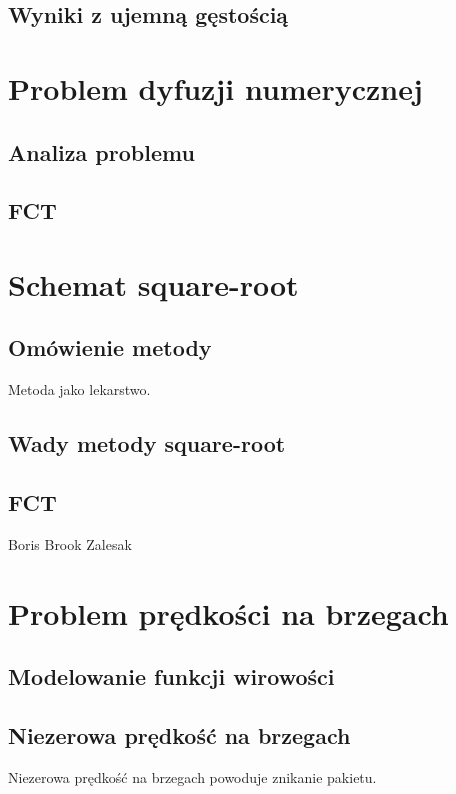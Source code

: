 \documentclass[a4paper,12pt]{book}
\begin{document}
\section{Wyniki z ujemną gęstością}
\chapter{Problem dyfuzji numerycznej}
\section{Analiza problemu}
\section{FCT}

\chapter{Schemat square-root}
\section{Omówienie metody}
Metoda jako lekarstwo.
\section{Wady metody square-root}
\section{FCT}
Boris Brook
Zalesak
\chapter{Problem prędkości na brzegach}
\section{Modelowanie funkcji wirowości}
\section{Niezerowa prędkość na brzegach}
Niezerowa prędkość na brzegach powoduje znikanie pakietu.
\end{document}
